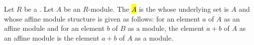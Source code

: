 \begin{definition} \label{definition:trivial_affine_module_of_a_module_over_a_ring}
    Let $R$ be a . Let $A$ be an $R$-module. 
    The  \hl{$A$} is the  whose underlying set is $A$ and whose affine module structure is given as follows: for an element $a$ of $A$ as an affine module and for an element $b$ of $B$ as a module, the element $a+b$ of $A$ as an affine module is the element $a+b$ of $A$ as a module.
\end{definition}